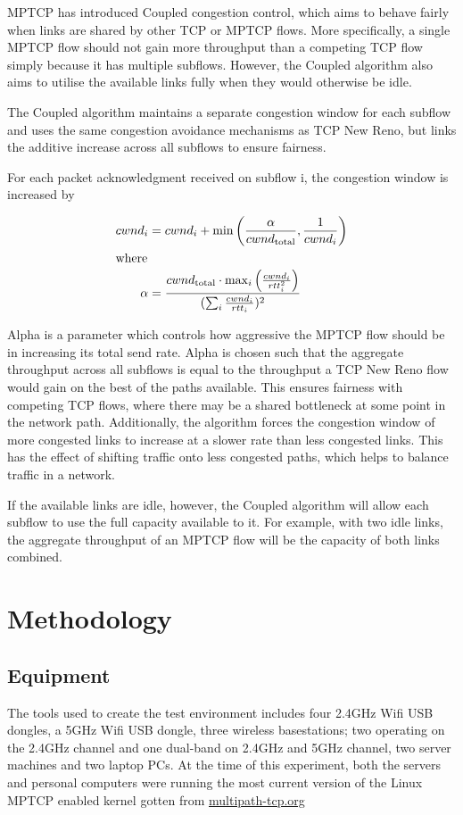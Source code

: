 \documentclass[12pt,a4paper]{article}
\begin{document}
MPTCP has introduced Coupled congestion control, which aims to behave fairly
when links are shared by other TCP or MPTCP flows. More specifically, a single
MPTCP flow should not gain more throughput than a competing TCP flow simply
because it has multiple subflows. However, the Coupled algorithm also aims to
utilise the available links fully when they would otherwise be idle.

The Coupled algorithm maintains a separate congestion window for each subflow
and uses the same congestion avoidance mechanisms as TCP New Reno, but links the
additive increase across all subflows to ensure fairness.

For each packet acknowledgment received on subflow i, the congestion window is
increased by

\begin{align*}
  cwnd_i &= cwnd_i +
    \min\left(\frac{\alpha}{cwnd_\text{total}}, \frac{1}{cwnd_i}\right) \\
  \intertext{where}
  \alpha &=
    \frac{cwnd_\text{total} \cdot \max_i\left(\frac{cwnd_i}{rtt_i^2}\right)}
         {(\sum_i \frac{cwnd_i}{rtt_i})^2}
\end{align*}

Alpha is a parameter which controls how aggressive the MPTCP flow should be in
increasing its total send rate. Alpha is chosen such that the aggregate
throughput across all subflows is equal to the throughput a TCP New Reno flow
would gain on the best of the paths available. This ensures fairness with
competing TCP flows, where there may be a shared bottleneck at some point in the
network path. Additionally, the algorithm forces the congestion window of more
congested links to increase at a slower rate than less congested links. This has
the effect of shifting traffic  onto less congested paths, which helps to
balance traffic in a network.

If the available links are idle, however, the Coupled algorithm will allow each
subflow to use the full capacity available to it. For example, with two idle
links, the aggregate throughput of an MPTCP flow will be the capacity of both
links combined.

\section{Methodology}
\subsection{Equipment}
The tools used to create the test environment includes four 2.4GHz Wifi USB
dongles, a 5GHz Wifi USB dongle, three wireless basestations; two operating on
the 2.4GHz channel and one dual-band on 2.4GHz and  5GHz channel, two server
machines and two laptop PCs. At the time of this experiment, both the servers
and personal computers were running the most current version of the Linux MPTCP
enabled kernel gotten from \href{http://multipath-tcp.org/}{multipath-tcp.org}
\end{document}
